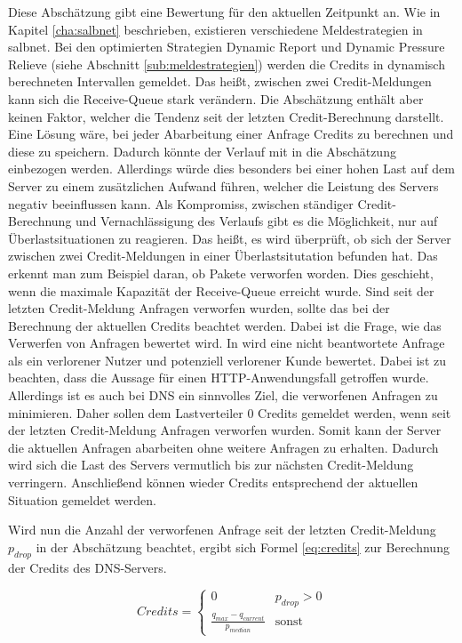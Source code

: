 \documentclass[a4paper, 12pt, BCOR10mm, DIV12, toc=bibliography, toc=listof, german]{scrbook}
\begin{document}
		Diese Abschätzung gibt eine Bewertung für den aktuellen Zeitpunkt an. Wie in Kapitel
		\ref{cha:salbnet} beschrieben, existieren verschiedene Meldestrategien in salbnet. Bei den
		optimierten Strategien Dynamic Report und Dynamic Pressure Relieve (siehe Abschnitt
		\ref{sub:meldestrategien}) werden die Credits in dynamisch berechneten Intervallen gemeldet. Das
		heißt, zwischen zwei Credit-Meldungen kann sich die Receive-Queue stark verändern. Die
		Abschätzung enthält aber keinen Faktor, welcher die Tendenz seit der letzten Credit-Berechnung
		darstellt. Eine Lösung wäre, bei jeder Abarbeitung einer Anfrage Credits zu berechnen und diese
		zu speichern. Dadurch könnte der Verlauf mit in die Abschätzung einbezogen werden. Allerdings würde
		dies besonders bei einer hohen Last auf dem Server zu einem zusätzlichen Aufwand führen, welcher
		die Leistung des Servers negativ beeinflussen kann. Als Kompromiss, zwischen ständiger
		Credit-Berechnung und Vernachlässigung des Verlaufs gibt es die Möglichkeit, nur auf
		Überlastsituationen zu reagieren. Das heißt, es wird überprüft, ob sich der Server zwischen zwei
		Credit-Meldungen in einer Überlastsitutation befunden hat. Das erkennt man zum Beispiel daran,
		ob Pakete verworfen worden. Dies geschieht, wenn die maximale Kapazität der Receive-Queue
		erreicht wurde. Sind seit der letzten Credit-Meldung Anfragen verworfen wurden, sollte das bei
		der Berechnung der aktuellen Credits beachtet werden.  Dabei ist die Frage, wie das Verwerfen
		von Anfragen bewertet wird. In \cite{scsczile2008} wird eine nicht beantwortete Anfrage als ein
		verlorener Nutzer und potenziell verlorener Kunde bewertet. Dabei ist zu beachten, dass
		die Aussage für einen HTTP-Anwendungsfall getroffen wurde.  Allerdings ist es auch bei DNS ein
		sinnvolles Ziel, die verworfenen Anfragen zu minimieren. Daher sollen dem Lastverteiler 0 Credits
		gemeldet werden, wenn seit der letzten Credit-Meldung Anfragen verworfen wurden. Somit kann der
		Server die aktuellen Anfragen abarbeiten ohne weitere Anfragen zu erhalten. Dadurch wird sich
		die Last des Servers vermutlich bis zur nächsten Credit-Meldung verringern. Anschließend können
		wieder Credits entsprechend der aktuellen Situation gemeldet werden.

		Wird nun die Anzahl der verworfenen Anfrage seit der letzten Credit-Meldung $p_{drop}$
		in der Abschätzung beachtet, ergibt sich Formel \ref{eq:credits} zur Berechnung der Credits des
		DNS-Servers.

		\begin{equation}
			Credits = \begin{cases}0 & p_{drop}>0\\ \frac{\displaystyle q_{max} - q_{current}}{\displaystyle p_{median}}
			  & \text{sonst}\end{cases}
			\label{eq:credits}
		\end{equation}
\end{document}
